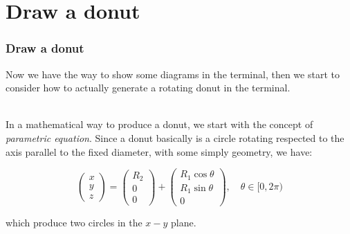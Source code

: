 \documentclass[12pt, t]{beamer}
\renewcommand{\emph}[1]{{\color{Turquoise3}\textsl{#1}}}
\newcommand{\nullspace}{~\\[15pt]}
\begin{document}
\section{Draw a donut}
\begin{frame}
    \frametitle{Draw a donut}

    Now we have the way to show some diagrams in the terminal, then we start to consider how to
    actually generate a rotating donut in the terminal.

    \nullspace
    In a mathematical way to produce a donut, we start with the concept of \emph{parametric equation}.
    Since a donut basically is a circle rotating respected to the axis parallel to the fixed diameter,
    with some simply geometry, we have:

    \begin{equation*}
        \begin{pmatrix}
            x \\
            y \\
            z
        \end{pmatrix}
        =
        \begin{pmatrix}
            R_2 \\
            0   \\
            0
        \end{pmatrix}
        +
        \begin{pmatrix}
            R_1\cos{\theta} \\
            R_1\sin{\theta} \\
            0
        \end{pmatrix}
        ,\quad \theta \in [0,2\pi)
    \end{equation*}

    which produce two circles in the $x-y$ plane.

\end{frame}

\end{document}
